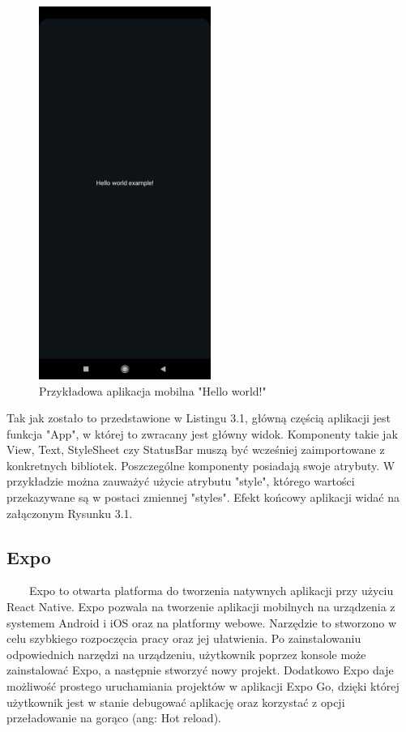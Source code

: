 \documentclass[a4paper,12pt,oneside]{book}
\begin{document}
	\begin{figure}[H]
		\centering
		\includegraphics[width=0.5\textwidth]{grafika/hello_world.jpg}
		\caption{Przykładowa aplikacja mobilna "Hello world!"}
	\end{figure}

	Tak jak zostało to przedstawione w Listingu 3.1, główną częścią aplikacji jest funkcja "App", w której to zwracany jest główny widok. Komponenty takie jak View, Text, StyleSheet czy StatusBar muszą być wcześniej zaimportowane z konkretnych bibliotek. Poszczególne komponenty posiadają swoje atrybuty. W przykładzie można zauważyć użycie atrybutu "style", którego wartości przekazywane są w postaci zmiennej "styles". Efekt końcowy aplikacji widać na załączonym Rysunku 3.1.
	
	\subsection{Expo}
	\ \ \ \
	Expo to otwarta platforma do tworzenia natywnych aplikacji przy użyciu React Native. Expo pozwala na tworzenie aplikacji mobilnych na urządzenia z systemem Android i iOS oraz na platformy webowe. Narzędzie to stworzono w celu szybkiego rozpoczęcia pracy oraz jej ułatwienia. Po zainstalowaniu odpowiednich narzędzi na urządzeniu, użytkownik poprzez konsole może zainstalować Expo, a następnie stworzyć nowy projekt. Dodatkowo Expo daje możliwość prostego uruchamiania projektów w aplikacji Expo Go, dzięki której użytkownik jest w stanie debugować aplikację oraz korzystać z opcji przeładowanie na gorąco (ang: Hot reload).
	
\end{document}
